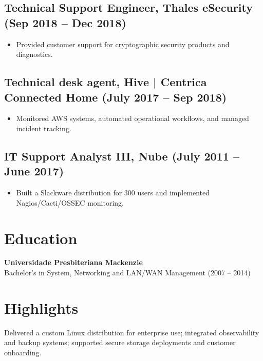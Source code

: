 \documentclass[9pt,a4paper]{article}
\begin{document}
\begin{minipage}[t]{0.65\textwidth}
  \subsection*{Technical Support Engineer, Thales eSecurity \textnormal{(Sep 2018 -- Dec 2018)}}
  \begin{itemize}
    \item Provided customer support for cryptographic security products and diagnostics.
  \end{itemize}
  \subsection*{Technical desk agent, Hive | Centrica Connected Home \textnormal{(July 2017 -- Sep 2018)}}
  \begin{itemize}
    \item Monitored AWS systems, automated operational workflows, and managed incident tracking.
  \end{itemize}
  \subsection*{IT Support Analyst III, Nube \textnormal{(July 2011 -- June 2017)}}
  \begin{itemize}
    \item Built a Slackware distribution for 300 users and implemented Nagios/Cacti/OSSEC monitoring.
  \end{itemize}
  \section*{Education}
  \textbf{Universidade Presbiteriana Mackenzie}\\
  Bachelor's in System, Networking and LAN/WAN Management (2007 -- 2014)\\[0.75em]
  \section*{Highlights}
  Delivered a custom Linux distribution for enterprise use; integrated observability and backup systems; supported secure storage deployments and customer onboarding.
\end{minipage}
\end{document}
